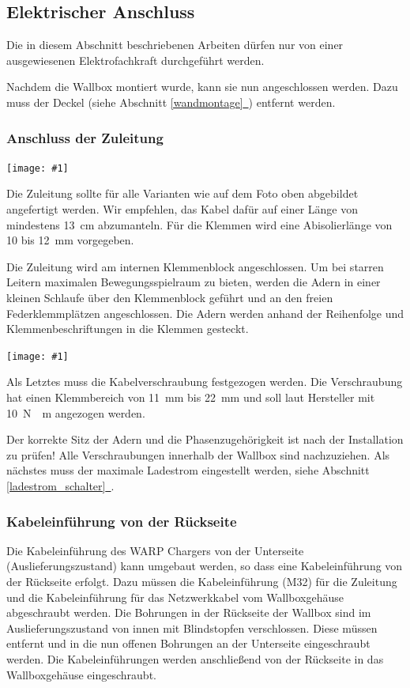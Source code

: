\documentclass[a4paper,10pt]{article}
\newcommand{\hint}[1]{\begin{tcolorbox}[colback=boxgray,colframe=black,coltext=
white,title=Hinweis,left*=2mm,right*=2mm,boxsep=1mm,bottom=1mm,top=1mm]#1\end{tcolorbox}}
\newcommand{\gfx}[1]{\texttt{[image: \#1]}}
\newcommand*{\fullref}[1]{Abschnitt \hyperref[{#1}]{\ref*{#1}~\nameref*{#1}}}
\begin{document}
\begin{multicols*}{2}
    \subsection{Elektrischer Anschluss}
    \hint{Die in diesem Abschnitt beschriebenen Arbeiten dürfen nur von einer ausgewiesenen
        Elektrofachkraft durchgeführt werden.}

    Nachdem die Wallbox montiert wurde, kann sie nun angeschlossen werden. Dazu
    muss der Deckel (siehe \fullref{wandmontage}) entfernt werden.

    \subsubsection{Anschluss der Zuleitung}
    \gfx{./img_warp3/resized/warp_cable_cut_ready}

    Die Zuleitung sollte für alle Varianten wie auf dem Foto oben abgebildet
    angefertigt werden. Wir empfehlen, das Kabel dafür auf einer Länge von
	mindestens \SI{13}{\centi\meter} abzumanteln. Für die Klemmen wird eine
    Abisolierlänge von 10 bis \SI{12}{\milli\meter} vorgegeben.

    Die Zuleitung wird am internen Klemmenblock
    angeschlossen. Um bei starren Leitern maximalen Bewegungsspielraum zu bieten,
    werden die Adern in einer kleinen Schlaufe über den Klemmenblock geführt
	und an den freien Federklemmplätzen angeschlossen. Die Adern werden anhand der Reihenfolge und
    Klemmenbeschriftungen in die Klemmen gesteckt.

    \gfx{./img_warp3/resized/warp3_smart_open_connected}

    Als Letztes muss die Kabelverschraubung festgezogen werden. Die Verschraubung
    hat einen Klemmbereich von \SI{11}{\milli\meter} bis \SI{22}{\milli\meter} und soll laut Hersteller mit
    \SI{10}{\newton{}\meter} angezogen werden.

    Der korrekte Sitz der Adern und die Phasenzugehörigkeit ist nach der
    Installation zu prüfen! Alle Verschraubungen innerhalb der Wallbox sind nachzuziehen.
    Als nächstes muss der maximale Ladestrom eingestellt werden, siehe
	\fullref{ladestrom_schalter}.

    \subsubsection{Kabeleinführung von der Rückseite}
    Die Kabeleinführung des WARP Chargers von der Unterseite
    (Auslieferungszustand) kann umgebaut werden, so dass eine Kabeleinführung von der
    Rückseite erfolgt. Dazu müssen die Kabeleinführung (M32) für die Zuleitung und die
    Kabeleinführung für das Netzwerkkabel vom Wallboxgehäuse abgeschraubt
    werden. Die Bohrungen in der Rückseite der Wallbox sind im
    Auslieferungszustand von innen mit Blindstopfen verschlossen.
    Diese müssen entfernt und in die nun offenen Bohrungen an der Unterseite
    eingeschraubt werden. Die Kabeleinführungen werden anschließend von
    der Rückseite in das Wallboxgehäuse eingeschraubt.


\end{multicols*}
\end{document}
